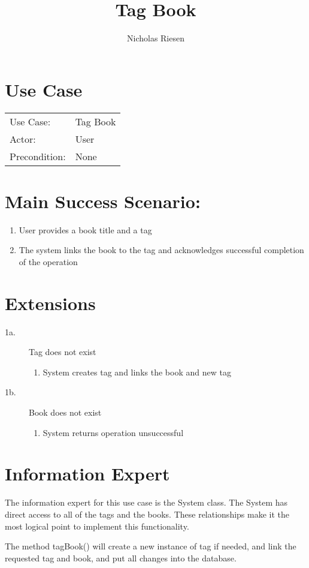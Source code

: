 \documentclass{article}
\title{Tag Book}
\author{Nicholas Riesen}
\begin{document}
\maketitle

\section*{Use Case}
 \begin{tabular}{l l}
 
Use Case:     & Tag Book \\
Actor:        & User     \\
Precondition: & None     \\
\end{tabular}

\section*{Main Success Scenario:}
\begin{enumerate}
    \item User provides a book title and a tag
    \item The system links the book to the tag and  acknowledges successful completion of the operation
\end{enumerate}

\section*{Extensions}
\begin{description}
    \item[1a.] Tag does not exist
    \begin{enumerate}
        \item System creates tag and links the book and new tag
    \end{enumerate}
    \item[1b.] Book does not exist
    \begin{enumerate}
        \item System returns operation unsuccessful
    \end{enumerate}
\end{description}

\section*{Information Expert}
The information expert for this use case is the System class. The System has
direct access to all of the tags and the books. These relationships make it the
most logical point to implement this functionality.


The method tagBook() will create a new instance of tag if needed, and link the
requested tag and book, and put all changes into the database.
\end{document}
